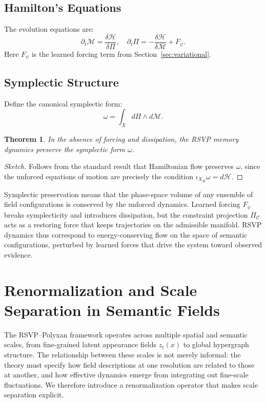 \documentclass[11pt]{article}
\newtheorem{theorem}{Theorem}[section]
\begin{document}
\subsection{Hamilton's Equations}

The evolution equations are:
\[
\partial_t \mathcal{M}
=
\frac{\delta \mathcal{H}}{\delta \Pi},
\quad
\partial_t \Pi
=
- \frac{\delta \mathcal{H}}{\delta \mathcal{M}} + F_\psi.
\]
Here $F_\psi$ is the learned forcing term from Section~\ref{sec:variational}.

\subsection{Symplectic Structure}

Define the canonical symplectic form:
\[
\omega = \int_X d\Pi \wedge d\mathcal{M}.
\]

\begin{theorem}
In the absence of forcing and dissipation, the RSVP memory dynamics
preserve the symplectic form $\omega$.
\end{theorem}

\begin{proof}[Sketch]
Follows from the standard result that Hamiltonian flow preserves $\omega$,
since the unforced equations of motion are precisely the condition
$\iota_{X_H}\omega = d\mathcal{H}$.
\end{proof}

Symplectic preservation means that the phase-space volume of any ensemble
of field configurations is conserved by the unforced dynamics.
Learned forcing $F_\psi$ breaks symplecticity and introduces dissipation,
but the constraint projection $\Pi_{\mathcal{C}}$ acts as a restoring
force that keeps trajectories on the admissible manifold.
RSVP dynamics thus correspond to energy-conserving flow on the space of
semantic configurations, perturbed by learned forces that drive the system
toward observed evidence.

\section{Renormalization and Scale Separation in Semantic Fields}
\label{sec:renorm}

The RSVP--Polyxan framework operates across multiple spatial and semantic
scales, from fine-grained latent appearance fields $z_t(x)$ to global
hypergraph structure.
The relationship between these scales is not merely informal: the theory
must specify how field descriptions at one resolution are related to those
at another, and how effective dynamics emerge from integrating out
fine-scale fluctuations.
We therefore introduce a renormalization operator that makes scale
separation explicit.
\end{document}

